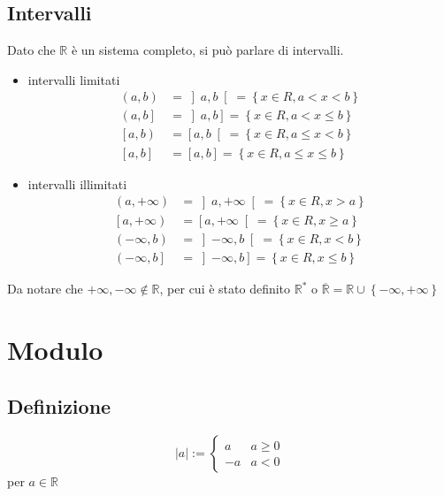 \documentclass[a4paper]{article}
\begin{document}
\subsection{Intervalli}
Dato che \(\mathbb{R}\) è un sistema completo, si può parlare di intervalli.
\begin{itemize}
	\item intervalli limitati
	\begin{align*}
		\left(a, b \right) &= \left]a, b \right[ = \left\{x \in R, a < x < b \right\} \\
		\left(a, b \right] &= \left]a, b \right] = \left\{x \in R, a < x \leq b \right\} \\
		\left[a, b \right) &= \left[a, b \right[ = \left\{x \in R, a \leq x < b \right\} \\
		\left[a, b \right] &= \left[a, b \right] = \left\{x \in R, a \leq x \leq b \right\}
	\end{align*}
	\item intervalli illimitati
	\begin{align*}
		\left(a, +\infty \right) &= \left] a, +\infty \right[ = \left\{x \in R, x > a \right\} \\
		\left[a, +\infty \right) &= \left[ a, +\infty \right[ = \left\{x \in R, x \geq a \right\} \\
		\left(-\infty, b \right) &= \left] -\infty, b \right[ = \left\{x \in R, x < b \right\} \\
		\left(-\infty, b \right] &= \left] -\infty, b \right] = \left\{x \in R, x \leq b \right\}
	\end{align*}
\end{itemize}
Da notare che \(+\infty, -\infty \notin \mathbb{R}\), per cui è stato definito \(\mathbb{R}^*\) o \(\overline{\mathbb{R}} = \mathbb{R} \cup \left\{ -\infty, +\infty \right\}\)

\newpage


\section{Modulo}
\subsection{Definizione}
\begin{equation*}
	\left| a \right| :=
	\begin{cases}
		a & a \geq 0 \\
		-a & a < 0
	\end{cases}
\end{equation*}
per \(a \in \mathbb{R}\)
\end{document}
